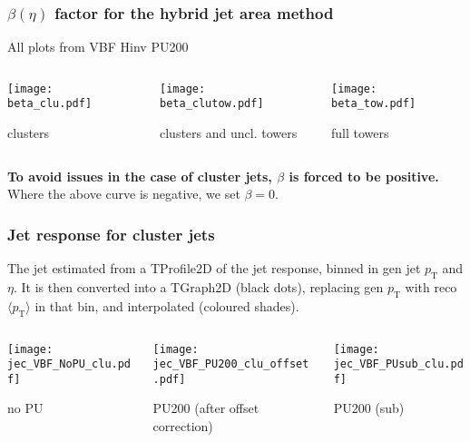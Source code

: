 \documentclass[8pt]{beamer}
\begin{document}
 \begin{frame}
  \frametitle{$\beta(\eta)$ factor for the hybrid jet area method}
  
  All plots from VBF Hinv PU200
  
  \vspace{10pt}
  
  \begin{columns}
   \begin{column}{0.35\textwidth}
    \texttt{[image: beta\_clu.pdf]}
    
    clusters
   \end{column}
   \begin{column}{0.35\textwidth}
    \texttt{[image: beta\_clutow.pdf]}
    
    clusters and uncl. towers
   \end{column}
   \begin{column}{0.35\textwidth}
    \texttt{[image: beta\_tow.pdf]}
    
    full towers
   \end{column}
  \end{columns}
  
  \vspace{10pt}
  
  \textbf{To avoid issues in the case of cluster jets, $\beta$ is forced to be positive.} Where the above curve is negative, we set $\beta = 0$.
 \end{frame}



 
 \begin{frame}
  \frametitle{Jet response for cluster jets}
  
  The jet estimated from a TProfile2D of the jet response, binned in gen jet $p_\text{T}$ and $\eta$. It is then converted into a TGraph2D (black dots), replacing gen $p_\text{T}$ with reco $\langle p_\text{T} \rangle$ in that bin, and interpolated (coloured shades).
  
  \vspace{15pt}
  
  \begin{columns}
   \begin{column}{0.35\textwidth}
    \texttt{[image: jec\_VBF\_NoPU\_clu.pdf]}
    
    no PU
   \end{column}
   \begin{column}{0.35\textwidth}
    \texttt{[image: jec\_VBF\_PU200\_clu\_offset.pdf]}
    
    PU200 (after offset correction)
   \end{column}
   \begin{column}{0.35\textwidth}
    \texttt{[image: jec\_VBF\_PUsub\_clu.pdf]}
    
    PU200 (sub)
   \end{column}
  \end{columns}

 \end{frame}
 
\end{document}
